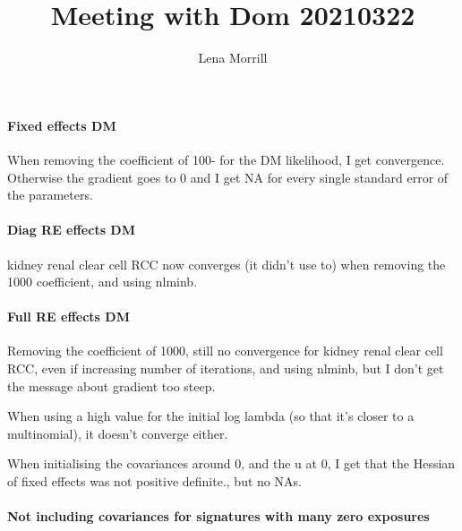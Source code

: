 \documentclass{article}
\title{Meeting with Dom 20210322}
\author{Lena Morrill}
\begin{document}
\maketitle

\paragraph{Fixed effects DM} When removing the coefficient of 100- for the DM likelihood, I get convergence. Otherwise the gradient goes to 0 and I get NA for every single standard error of the parameters.

\paragraph{Diag RE effects DM} kidney renal clear cell RCC now converges (it didn't use to) when removing the 1000 coefficient, and using nlminb.

\paragraph{Full RE effects DM} Removing the coefficient of 1000, still no convergence for kidney renal clear cell RCC, even if increasing number of iterations, and using nlminb, but I don't get the message about gradient too steep.

When using a high value for the initial log lambda (so that it's closer to a multinomial), it doesn't converge either.

When initialising the covariances around 0, and the u at 0, I get that the Hessian of fixed effects was not positive definite., but no NAs.

\paragraph{Not including covariances for signatures with many zero exposures}
\end{document}
